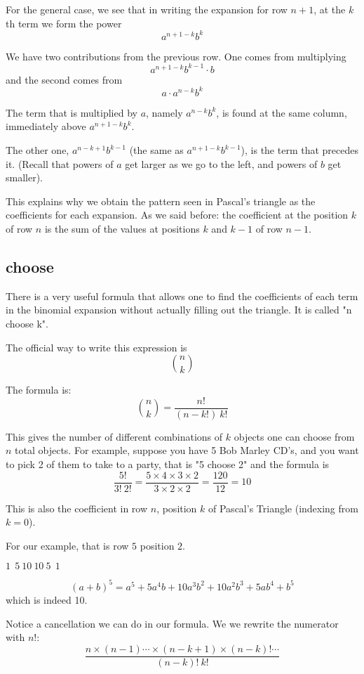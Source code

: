 \documentclass[11pt, oneside]{article}   	%
\begin{document}
For the general case, we see that in writing the expansion for row $n+1$, at the $k$th term we form the power
\[ a^{n+1-k}b^{k} \] 

We have two contributions from the previous row.  One comes from multiplying
\[ a^{n+1-k}b^{k-1} \cdot b \]
and the second comes from
\[ a \cdot a^{n-k}b^{k} \]

The term that is multiplied by $a$, namely $a^{n-k}b^{k}$, is found at the same column, immediately above $a^{n+1-k}b^{k}$.

The other one, $a^{n-k+1}b^{k-1}$ (the same as $a^{n+1-k}b^{k-1}$), is the term that precedes it.  (Recall that powers of $a$ get larger as we go to the left, and powers of $b$ get smaller).

This explains why we obtain the pattern seen in Pascal's triangle as the coefficients for each expansion.  As we said before:  the coefficient at the position $k$ of row $n$ is the sum of the values at positions $k$ and $k-1$ of row $n-1$.

\subsection*{choose}
There is a very useful formula that allows one to find the coefficients of each term in the binomial expansion without actually filling out the triangle.  It is called "n choose k".

The official way to write this expression is
\[  {{n}\choose{k}} \]

The formula is: 
\[  {{n}\choose{k}} = \frac{n!}{(n-k!) \ k!} \]

This gives the number of different combinations of $k$ objects one can choose from $n$ total objects.  For example, suppose you have 5 Bob Marley CD's, and you want to pick 2 of them to take to a party, that is "5 choose 2" and the formula is
\[ \frac{5!}{3! \ 2!} = \frac{5 \times 4 \times 3 \times 2 }{3 \times 2 \times 2} = \frac{120}{12} = 10 \]

This is also the coefficient in row $n$, position $k$ of Pascal's Triangle (indexing from $k=0$).  

For our example, that is row $5$ position $2$.

$1 \ \ 5 \ 10 \ 10 \ 5 \ \ 1$

\[ (a+b)^5 = a^5 + 5a^4b + 10a^3b^2 + 10a^2b^3 + 5ab^4 + b^5 \]
which is indeed 10.

Notice a cancellation we can do in our formula.  We we rewrite the numerator with $n!$:
\[ \frac{n \times (n-1) \cdots \times (n-k+1) \times (n-k)! \cdots}{(n-k)! \ k!}  \]
\end{document}
